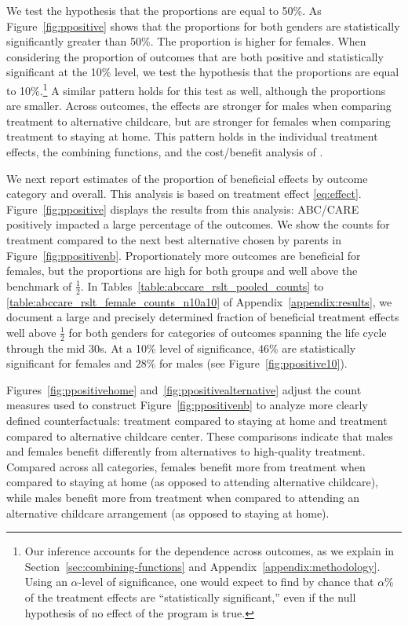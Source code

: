 We test the hypothesis that the proportions are equal to 50\%. As Figure~\ref{fig:ppositive} shows that the proportions for both genders are statistically significantly greater than 50\%. The proportion is higher for females. When considering the proportion of outcomes that are both positive and statistically significant at the 10\% level, we test the hypothesis that the proportions are equal to 10\%.\footnote{Our inference accounts for the dependence across outcomes, as we explain in Section~\ref{sec:combining-functions} and Appendix~\ref{appendix:methodology}. Using an $\alpha$-level of significance, one would expect to find by chance that $\alpha\%$ of the treatment effects are ``statistically significant,'' even if the null hypothesis of no effect of the program is true.} A similar pattern holds for this test as well, although the proportions are smaller. Across outcomes, the effects are stronger for males when comparing treatment to alternative childcare, but are stronger for females when comparing treatment to staying at home. This pattern holds in the individual treatment effects, the combining functions, and the cost/benefit analysis of \citet{Garcia_Heckman_Leaf_etal_2017_Comp_CBA_Unpublished}.

We next report estimates of the proportion of beneficial effects by outcome category and overall. This analysis is based on treatment effect \eqref{eq:effect}. Figure~\ref{fig:ppositive} displays the results from this analysis: ABC/CARE positively impacted a large percentage of the outcomes. We show the counts for treatment compared to the next best alternative chosen by parents in Figure~\ref{fig:ppositivenb}. Proportionately more outcomes are beneficial for females, but the proportions are high for both groups and well above the benchmark of $\frac{1}{2}$. In Tables~\ref{table:abccare_rslt_pooled_counts} to \ref{table:abccare_rslt_female_counts_n10a10} of Appendix~\ref{appendix:results}, we document a large and precisely determined fraction of beneficial treatment effects well above $\frac{1}{2}$ for both genders for categories of outcomes spanning the life cycle through the mid 30s. At a 10\% level of significance, $46\%$ are statistically significant for females and $28\%$ for males (see Figure~\ref{fig:ppositive10}).

Figures~\ref{fig:ppositivehome} and~\ref{fig:ppositivealternative} adjust the count measures used to construct Figure~\ref{fig:ppositivenb} to analyze more clearly defined counterfactuals: treatment compared to staying at home and treatment compared to alternative childcare center. These comparisons indicate that males and females benefit differently from alternatives to high-quality treatment. Compared across all categories, females benefit more from treatment when compared to staying at home (as opposed to attending alternative childcare), while males benefit more from treatment when compared to attending an alternative childcare arrangement (as opposed to staying at home).

